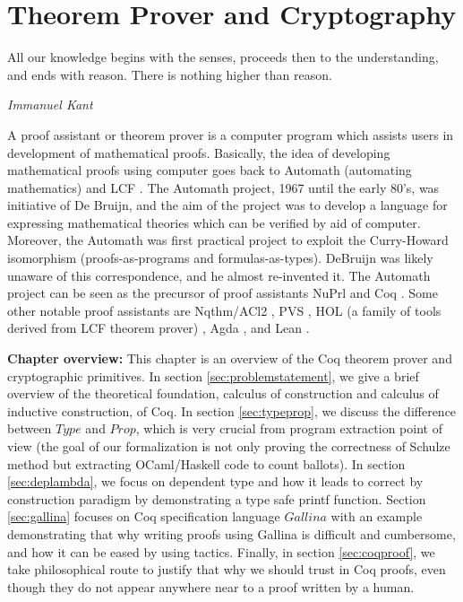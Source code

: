 \chapter{Theorem Prover and Cryptography}
\label{cha:theorem_crypto}
 \setlength{\parindent}{2em}
\setlength{\parskip}{1em}

\epigraph{All our knowledge begins with the senses, proceeds then to the understanding, and
 ends with reason. There is nothing higher than reason.} 
{\textit{Immanuel Kant}} 

A proof assistant or theorem prover is a computer program which assists users in development 
of mathematical proofs. Basically, the idea of 
developing mathematical proofs using computer goes back to Automath (automating mathematics)
\citep{deBruijn1983} and LCF \citep{Milner:1972:IAS:942578.807067}. The 
Automath project,  1967 until the early 80's,  was initiative of De Bruijn, and the aim of the project was to 
develop a language for expressing mathematical theories which can be verified by aid of computer.  
Moreover, the Automath was first 
practical project to exploit the Curry-Howard isomorphism (proofs-as-programs and formulas-as-types). 
DeBruijn  was likely unaware of this correspondence, and he almost re-invented it.
The Automath project can be seen as the precursor of
 proof assistants NuPrl \citep{Constable:1986:IMN:10510} and Coq \citep{Bertot:2004:ITP}.  
 Some other notable  proof assistants are 
 Nqthm/ACl2 \citep{507872}, PVS \citep{Owre:1992:PPV:648230.752639},
 HOL (a family of tools derived from LCF theorem prover) \citep{Slind:2008:BOH:1459784.1459792}
 \citep{Harrison:1996:HLT:646184.682934} \citep{Nipkow:2002:IHP},
 Agda \citep{Norell:2008:DTP:1813347.1813352}, and Lean \citep{10.1007/978-3-319-21401-6_26}.


\textbf{Chapter overview:}
 This chapter is an overview of the Coq theorem prover and cryptographic primitives. 
 In section \ref{sec:problemstatement}, we give a brief overview of 
 the theoretical foundation, calculus of construction and calculus of inductive 
 construction, of Coq.  In section \ref{sec:typeprop}, we discuss
 the difference between $Type$ and $Prop$,
 which is very crucial from program extraction point of view (the goal of 
 our formalization is  not only proving the correctness of 
 Schulze method but extracting  OCaml/Haskell code to count 
 ballots).  In section \ref{sec:deplambda}, we focus 
 on dependent type and  how it leads to correct by construction paradigm
 by demonstrating a  type safe printf function. 
 Section \ref{sec:gallina} focuses on Coq specification language 
 $Gallina$ with an example demonstrating that why writing proofs using  
 Gallina is difficult and cumbersome, and how it can be eased by 
 using tactics. Finally, in section  \ref{sec:coqproof}, we take 
 philosophical route to justify that why we should trust in Coq proofs, 
 even though they do not appear anywhere near to a proof written by 
 a human.  
 

